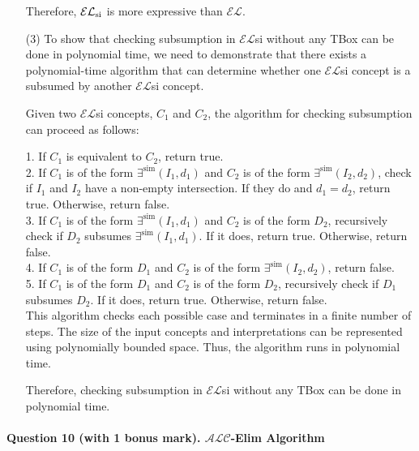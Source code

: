 \documentclass[12pt]{article}
\begin{document}
\begin{enumerate}
Therefore, $ \mathcal{EL}_{\rm si} $ is more expressive than $ \mathcal{EL} $.
        \item [(3)]
        To show that checking subsumption in $\mathcal{EL}$si without any TBox can be done in polynomial time, we need to demonstrate that there exists a polynomial-time algorithm that can determine whether one $\mathcal{EL}$si concept is a subsumed by another $\mathcal{EL}$si concept.

Given two $\mathcal{EL}$si concepts, $C_1$ and $C_2$, the algorithm for checking subsumption can proceed as follows:

1. If $C_1$ is equivalent to $C_2$, return true. \\
2. If $C_1$ is of the form $\exists^{\text{sim}}(I_1, d_1)$ and $C_2$ is of the form $\exists^{\text{sim}}(I_2, d_2)$, check if $I_1$ and $I_2$ have a non-empty intersection. If they do and $d_1 = d_2$, return true. Otherwise, return false. \\
3. If $C_1$ is of the form $\exists^{\text{sim}}(I_1, d_1)$ and $C_2$ is of the form $D_2$, recursively check if $D_2$ subsumes $\exists^{\text{sim}}(I_1, d_1)$. If it does, return true. Otherwise, return false. \\
4. If $C_1$ is of the form $D_1$ and $C_2$ is of the form $\exists^{\text{sim}}(I_2, d_2)$, return false. \\
5. If $C_1$ is of the form $D_1$ and $C_2$ is of the form $D_2$, recursively check if $D_1$ subsumes $D_2$. If it does, return true. Otherwise, return false. \\
This algorithm checks each possible case and terminates in a finite number of steps. The size of the input concepts and interpretations can be represented using polynomially bounded space. Thus, the algorithm runs in polynomial time.

Therefore, checking subsumption in $\mathcal{EL}$si without any TBox can be done in polynomial time.
    \end{enumerate}



    \newpage
    \paragraph{Question 10 (with 1 bonus mark). $\mathcal{ALC}$-Elim Algorithm}~{}
    \\
\end{document}
